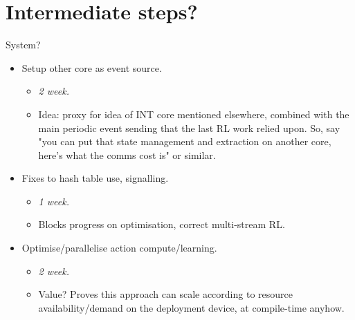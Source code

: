 \documentclass[sigconf,natbib=false]{acmart}
\begin{document}
\section{Intermediate steps?}
System?
\begin{itemize}
	\item Setup other core as event source.
	\begin{itemize}
		\item \emph{\num{2} week.}
		\item Idea: proxy for idea of INT core mentioned elsewhere, combined with the main periodic event sending that the last RL work relied upon. So, say "you can put that state management and extraction on another core, here's what the comms cost is" or similar.
	\end{itemize}
	\item Fixes to hash table use, signalling.
	\begin{itemize}
		\item \emph{\num{1} week.}
		\item Blocks progress on optimisation, correct multi-stream RL.
	\end{itemize}
	\item Optimise/parallelise action compute/learning.
	\begin{itemize}
		\item \emph{\num{2} week.}
		\item Value? Proves this approach can scale according to resource availability/demand on the deployment device, at compile-time anyhow.
	\end{itemize}
\end{itemize}
\end{document}

